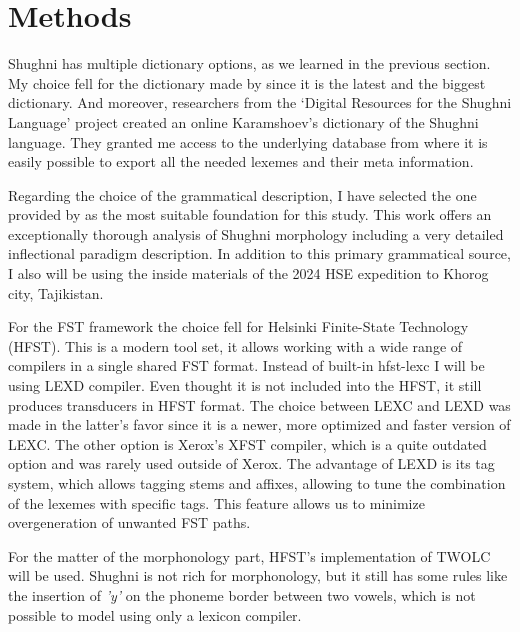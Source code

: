 \section{Methods}
\par Shughni has multiple dictionary options, as we learned in the previous section. My choice fell for the dictionary made by \textcite{karamshoev_dict_1988} since it is the latest and the biggest dictionary. And moreover, researchers from the `Digital Resources for the Shughni Language' project \parencite{makarov_digital_2022} created an online Karamshoev's dictionary of the Shughni language. They granted me access to the underlying database from where it is easily possible to export all the needed lexemes and their meta information.
\par Regarding the choice of the grammatical description, I have selected the one  provided by \textcite{parker_shughni_2023} as the most suitable foundation for this study. This work offers an exceptionally thorough analysis of Shughni morphology including a very detailed inflectional paradigm description. In addition to this primary grammatical source, I also will be using the inside materials of the 2024 HSE expedition  to Khorog city, Tajikistan.
\par For the FST framework the choice fell for Helsinki Finite-State Technology (HFST). This is a modern tool set, it allows working with a wide range of compilers in a single shared FST format. Instead of built-in hfst-lexc I will be using LEXD compiler. Even thought it is not included into the HFST, it still produces transducers in HFST format. The choice between LEXC and LEXD was made in the latter's favor since it is a newer, more optimized and faster version of LEXC. The other option is Xerox's XFST compiler, which is a quite outdated option and was rarely used outside of Xerox. The advantage of LEXD is its tag system, which allows tagging stems and affixes, allowing to tune the combination of the lexemes with specific tags. This feature allows us to minimize overgeneration of unwanted FST paths.
\par For the matter of the morphonology part, HFST's implementation of TWOLC will be used. Shughni is not rich for morphonology, but it still has some rules like the insertion of \textit{'y'} on the phoneme border between two vowels, which is not possible to model using only a lexicon compiler.
